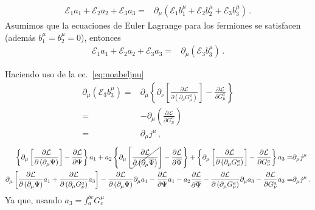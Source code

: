 \begin{align}
  \mathcal{E}_1 a_1 + \mathcal{E}_2 a_2 + \mathcal{E}_3 a_3=& \partial_{\mu} \left( \mathcal{E}_1 b_1^{\mu} + \mathcal{E}_2 b_2^{\mu} + \mathcal{E}_3 b_3^{\mu}   \right) \,.
\end{align}
Asumimos que la ecuaciones de Euler Lagrange para los fermiones se satisfacen (además $b_1^{\mu}=b_2^{\mu}=0$), entonces
\begin{align}
   \mathcal{E}_1 a_1 + \mathcal{E}_2 a_2 +  \mathcal{E}_3 a_3=& \partial_{\mu} \left(  \mathcal{E}_3 b_3^{\mu}   \right) \,.
\end{align}

Haciendo uso de la ec.~\eqref{eq:noabeljnu}
\begin{align}
  \partial_{\mu} \left(  \mathcal{E}_3 b_3^{\mu}   \right)=&
                                                \partial_{\mu} \left\{  \partial_\nu\left[\frac{\partial\mathcal{L}}{\partial\left(\partial_\nu G_\mu^a\right)}\right]-\frac{\partial\mathcal{L}}{\partial G_\mu^a}  \right\} \nonumber\\
  =&-\partial_{\mu}\left( \frac{\partial\mathcal{L}}{\partial G_\mu^a} \right) \nonumber\\
=& \partial_{\mu} j^{\mu}\,,
\end{align}
\begin{align}
  \left\{ \partial_{\mu}\left[{ \frac{\partial {\cal L}}{\partial \left( \partial_{\mu}\Psi \right)}}\right]-\frac{\partial{\cal L}}{\partial\Psi}  \right\}a_1+
  a_{2}\left\{ \partial_{\mu}\left[\cancel{ \frac{\partial {\cal L}}{\partial \left( \partial_{\mu}\overline{\Psi} \right)}}\right]-\frac{\partial{\cal L}}{\partial\overline{\Psi}}  \right\}+
  \left\{ \partial_\mu\left[\frac{\partial\mathcal{L}}{\partial\left(\partial_\mu G_\nu^a\right)}\right]-\frac{\partial\mathcal{L}}{\partial G_\nu^a} \right\} a_3 =&
 \partial_{\mu}j^{\mu}\nonumber\\
  \partial_{\mu}\left[ \frac{\partial {\cal L}}{\partial \left( \partial_{\mu}\Psi \right)}a_{1}+
  \frac{\partial\mathcal{L}}{\partial\left(\partial_\mu G_\nu^a\right)}a_{3}\right]
-\frac{\partial {\cal L}}{\partial \left( \partial_{\mu}\Psi \right)}\partial_{\mu} a_1
  -\frac{\partial{\cal L}}{\partial\Psi}a_{1}
  -a_2\frac{\partial{\cal L}}{\partial\overline{\Psi}}
  -\frac{\partial\mathcal{L}}{\partial\left(\partial_\mu G_\nu^a\right)}\partial_{\mu}a_{3}
  -\frac{\partial\mathcal{L}}{\partial G_\nu^a}a_{3}=&\partial_{\mu}j^{\mu}\,.
\end{align}
Ya que, usando $a_{3}=f_{a}^{bc} G^{\mu}_{c} $

